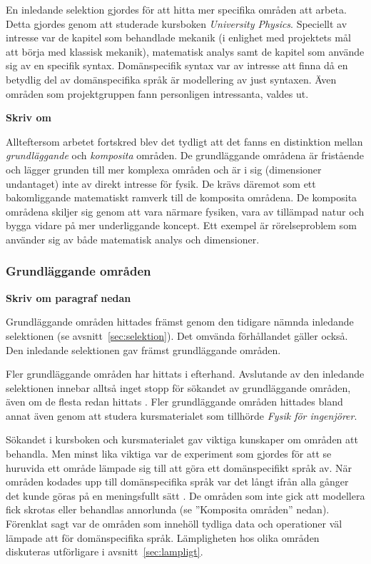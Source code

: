 \begin{binge}
En inledande selektion gjordes för att hitta mer specifika områden att arbeta.
Detta gjordes genom att studerade kursboken \textit{University Physics}.
Speciellt av intresse var de kapitel som behandlade mekanik (i enlighet med
projektets mål att börja med klassisk mekanik), matematisk analys samt de
kapitel som använde sig av en specifik syntax. Domänspecifik syntax var av
intresse att finna då en betydlig del av domänspecifika språk är modellering av
just syntaxen. 
Även områden som projektgruppen fann personligen intressanta, valdes ut.


\textbf{Skriv om}

Allteftersom arbetet fortskred blev det tydligt att det fanns en distinktion
mellan \textit{grundläggande} och \textit{komposita} områden. De grundläggande
områdena är fristående och lägger grunden till mer komplexa områden och är i sig
(dimensioner undantaget) inte av direkt intresse för fysik. De krävs däremot
som ett bakomliggande matematiskt ramverk till de komposita områdena. 
De komposita områdena skiljer sig genom att vara närmare fysiken, vara av
tillämpad natur och bygga vidare på mer underliggande koncept. Ett exempel är
rörelseproblem som använder sig av både matematisk analys och dimensioner.

\subsubsection*{Grundläggande områden}

\textbf{Skriv om paragraf nedan}

Grundläggande områden hittades främst genom den tidigare nämnda inledande
selektionen (se avsnitt~\ref{sec:selektion}). Det omvända förhållandet gäller
också. Den inledande selektionen gav främst grundläggande områden. 

Fler grundläggande områden har hittats i efterhand. Avslutande av den inledande
selektionen innebar alltså inget stopp för sökandet av grundläggande områden,
även om de flesta redan hittats . Fler grundläggande områden hittades bland annat även genom att
studera kursmaterialet som tillhörde \textit{Fysik för ingenjörer}.

Sökandet i kursboken och kursmaterialet gav viktiga kunskaper om områden att
behandla. Men minst lika viktiga var de experiment som gjordes för att se
huruvida ett område lämpade sig till att göra ett domänspecifikt språk av. När
områden kodades upp till domänspecifika språk var det långt ifrån alla gånger
det kunde göras på en meningsfullt sätt . De
områden som inte gick att modellera fick skrotas eller behandlas annorlunda
(se ''Komposita områden'' nedan). Förenklat sagt var de områden som
innehöll tydliga data och operationer väl lämpade att för domänspecifika
språk. Lämpligheten hos olika områden diskuteras utförligare i
avsnitt~\ref{sec:lampligt}.


\end{binge}
